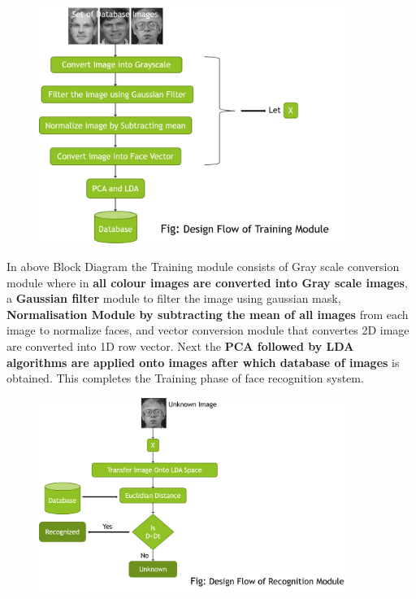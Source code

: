 \documentclass[xcolor=dvipsnames]{beamer}
\begin{document}
    \begin{frame}
    \begin{figure}[H]
        \graphicspath{{figs/}}
        \includegraphics[width=0.9\textwidth]{img4.png}
    \end{figure}
    \end{frame}
    
      \begin{frame}
    In above Block Diagram the Training module consists of Gray scale conversion module where in \textbf{all colour images are converted into Gray scale images}, a \textbf{Gaussian filter} module to filter the image using gaussian mask, \textbf{Normalisation Module by subtracting the mean of all images} from each image to normalize faces, and vector conversion module that convertes 2D image are converted into 1D row vector. \newline \newline
	Next the \textbf{PCA followed by LDA algorithms are applied onto images after which database of images} is obtained. This completes the Training phase of face recognition system.
       \end{frame}

    
    \begin{frame}
    \begin{figure}[H]
        \graphicspath{{figs/}}
        \includegraphics[width=0.9\textwidth]{img5.png}
    \end{figure}
    \end{frame}
    
\end{document}
